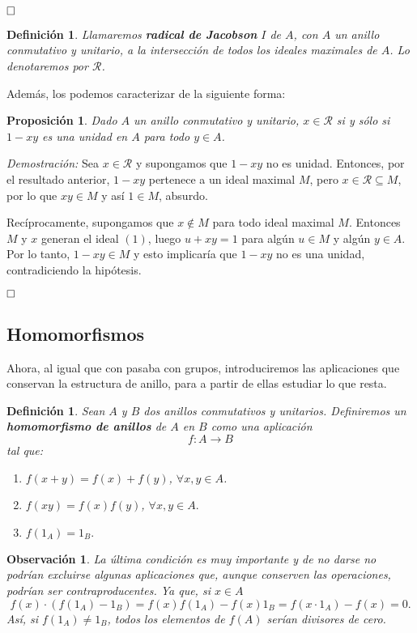 \documentclass[12pt]{article}
\newtheorem{proposition}[theorem]{Proposición}
\newtheorem{definition}[theorem]{Definición}
\newtheorem{observation}{Observación}[theorem]
\begin{document}
$\hfill \square$

\begin{definition} Llamaremos \textbf{radical de Jacobson} $I$ de $A$, con $A$ un anillo conmutativo y unitario, a la intersección de todos los ideales maximales de $A$. Lo denotaremos por $\mathcal{R}$.
\end{definition}

Además, los podemos caracterizar de la siguiente forma:

\begin{proposition}Dado $A$ un anillo conmutativo y unitario, $x \in \mathcal{R}$ si y sólo si $1-xy$ es una unidad en $A$ para todo $y \in A$.
\end{proposition}
\emph{Demostración: }Sea $x \in \mathcal{R}$ y supongamos que $1-xy$ no es unidad. Entonces, por el resultado anterior, $1-xy$ pertenece a un ideal maximal $M$, pero $x \in \mathcal{R} \subseteq M$, por lo que $xy \in M$ y así $1 \in M$, absurdo. 

Recíprocamente, supongamos que $x \notin M$ para todo ideal maximal $M$. Entonces $M$ y $x$ generan el ideal $(1)$, luego $u +xy = 1$ para algún $u \in M$ y algún $y \in A$. Por lo tanto, $1-xy \in M$ y esto implicaría que $1-xy$ no es una unidad, contradiciendo la hipótesis.

$\hfill \square$

\subsection{Homomorfismos}

Ahora, al igual que con pasaba con grupos, introduciremos las aplicaciones que conservan la estructura de anillo, para a partir de ellas estudiar lo que resta.

\begin{definition} Sean $A$ y $B$ dos anillos conmutativos y unitarios. Definiremos un \textbf{homomorfismo de anillos} de $A$ en $B$ como una aplicación $$f \colon A \longrightarrow B$$ tal que: \begin{enumerate}
\item $f(x + y) = f(x) + f(y)$, $\forall x,y \in A$.
\item $f(xy) = f(x)f(y)$, $\forall x,y \in A.$
\item $f(1_{A}) = 1_{B}.$
\end{enumerate}

\end{definition}
\begin{observation} La última condición es muy importante y de no darse no podrían excluirse algunas aplicaciones que, aunque conserven las operaciones, podrían ser contraproducentes. Ya que, si $x \in A$ $$f(x) \cdot (f(1_{A}) - 1_{B}) = f(x) f(1_{A}) - f(x)1_{B} = f(x \cdot 1_{A}) - f(x) = 0.$$ Así, si $f(1_{A}) \neq 1_{B}$, todos los elementos de $f(A)$ serían divisores de cero. 
\end{observation}
\end{document}
